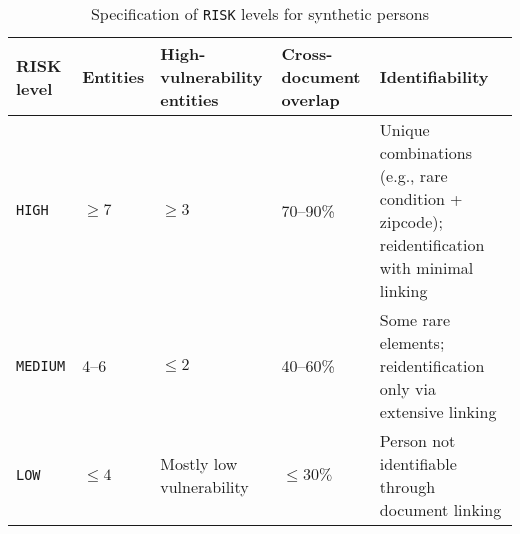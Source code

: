 \begin{table}[h]
\centering
\caption{Specification of \texttt{RISK} levels for synthetic persons}
\label{tab:data-gen-risk-profiles}
\begin{tabular}{l p{2.2cm} p{2.2cm} p{2.2cm} p{6cm}}
\toprule
\textbf{RISK level} & \textbf{Entities} & \textbf{High-vulnerability entities} & \textbf{Cross-document overlap} & \textbf{Identifiability} \\
\midrule
\texttt{HIGH} & $\geq 7$ & $\geq 3$ & 70--90\% & Unique combinations (e.g., rare condition + zipcode); reidentification with minimal linking \\
\texttt{MEDIUM} & 4--6 & $\leq 2$ & 40--60\% & Some rare elements; reidentification only via extensive linking \\
\texttt{LOW} & $\leq 4$ & Mostly low vulnerability & $\leq 30\%$ & Person not identifiable through document linking \\
\bottomrule
\end{tabular}
\end{table}

